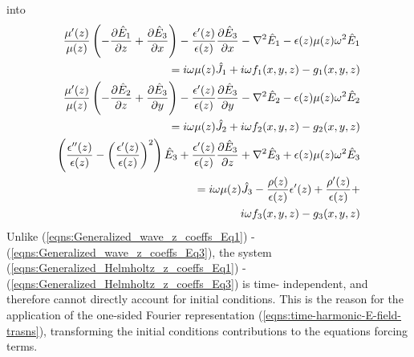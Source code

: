 \documentclass[12pt,twoside]{report}
\begin{document}
into
\begin{subequations}
\begin{align}
\label{eqns:Generalized_Helmholtz_z_coeffs_Eq1}
\dfrac{\mu'(z)}{\mu(z)}\left( -\dfrac{\partial \hat{E}_1}{\partial z} + \dfrac{\partial \hat{E}_3}{\partial x}\right)-\dfrac{\epsilon'(z)}{\epsilon(z)}\dfrac{\partial \hat{E}_3}{\partial x}-\nabla^2 \hat{E}_1 - \epsilon(z) \mu(z) \omega^2 \hat{E}_1 &\\
= i\omega \mu(z)\hat{J}_1 + i \omega f_1(x,y,z) - g_1(x,y,z) \notag\\
\label{eqns:Generalized_Helmholtz_z_coeffs_Eq2}
\dfrac{\mu'(z)}{\mu(z)}\left( -\dfrac{\partial \hat{E}_2}{\partial z} + \dfrac{\partial \hat{E}_3}{\partial y}\right)-\dfrac{\epsilon'(z)}{\epsilon(z)}\dfrac{\partial \hat{E}_3}{\partial y}-\nabla^2 \hat{E}_2 - \epsilon(z) \mu(z) \omega^2 \hat{E}_2 &\\= i \omega \mu(z)\hat{J}_2 + i \omega f_2(x,y,z)-g_2(x,y,z) \notag\\
\label{eqns:Generalized_Helmholtz_z_coeffs_Eq3}
\left( \dfrac{\epsilon''(z)}{\epsilon(z)}-\left( \dfrac{\epsilon'(z)}{\epsilon(z)}\right)^2 \right)\hat{E}_3 +\dfrac{\epsilon'(z)}{\epsilon(z)}\dfrac{\partial \hat{E}_3}{\partial z} + \nabla^2 \hat{E}_3 +\epsilon(z) \mu(z) \omega^2 \hat{E}_3 &\\
= i \omega \mu(z)\hat{J}_3 - \dfrac{\rho(z)}{\epsilon(z)}\epsilon'(z) + \dfrac{\rho'(z)}{\epsilon(z)} +\notag \\ i \omega f_3(x,y,z)- g_3(x,y,z)\notag 
\end{align}
\end{subequations}
Unlike (\ref{eqns:Generalized_wave_z_coeffs_Eq1}) -   (\ref{eqns:Generalized_wave_z_coeffs_Eq3}), the system (\ref{eqns:Generalized_Helmholtz_z_coeffs_Eq1}) -
(\ref{eqns:Generalized_Helmholtz_z_coeffs_Eq3}) is time- independent, and therefore cannot directly account for initial conditions. This is the reason for the application of the one-sided Fourier representation (\ref{eqns:time-harmonic-E-field-trasns}), transforming the initial conditions  contributions to the equations forcing terms. \\
\end{document}
